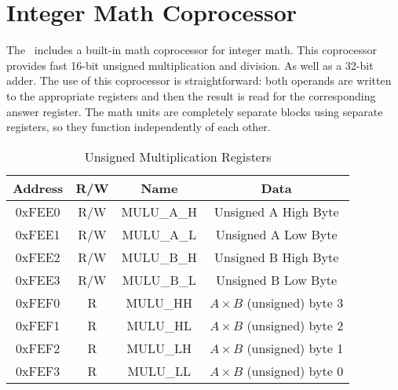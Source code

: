 \chapter{Integer Math Coprocessor}
\label{sec:int_math_copro}

The \jr\ includes a built-in math coprocessor for integer math. This coprocessor provides fast 16-bit unsigned multiplication and division. As well as a 32-bit adder. The use of this coprocessor is straightforward: both operands are written to the appropriate registers and then the result is read for the corresponding answer register. The math units are completely separate blocks using separate registers, so they function independently of each other.

\begin{table}[ht]
    \begin{center}
        \begin{tabular}{|c|c|c|c|} \hline
            Address & R/W & Name & Data \\\hline\hline
            0xFEE0  & R/W & MULU\_A\_H & Unsigned A High Byte \\\hline
            0xFEE1  & R/W & MULU\_A\_L & Unsigned A Low Byte \\\hline
            0xFEE2  & R/W & MULU\_B\_H & Unsigned B High Byte \\\hline
            0xFEE3  & R/W & MULU\_B\_L & Unsigned B Low Byte \\\hline
            0xFEF0  & R   & MULU\_HH   & $A \times B$ (unsigned) byte 3 \\\hline
            0xFEF1  & R   & MULU\_HL   & $A \times B$ (unsigned) byte 2 \\\hline
            0xFEF2  & R   & MULU\_LH   & $A \times B$ (unsigned) byte 1 \\\hline
            0xFEF3  & R   & MULU\_LL   & $A \times B$ (unsigned) byte 0 \\\hline
        \end{tabular}
    \end{center}
    \caption{Unsigned Multiplication Registers}
    \label{tab:math_mult_reg}
\end{table}

